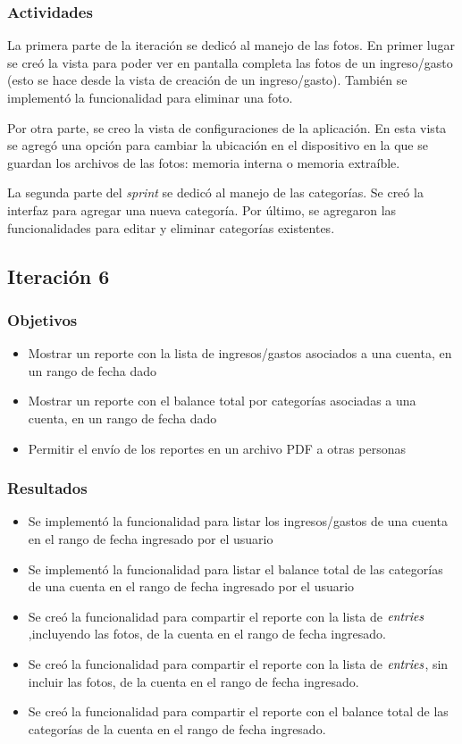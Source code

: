 \subsubsection{Actividades}
La primera parte de la iteración se dedicó al manejo de las fotos. En primer lugar se creó la vista para poder ver en pantalla completa las fotos de un ingreso/gasto (esto se hace desde la vista de creación de un ingreso/gasto). También se implementó la funcionalidad para eliminar una foto.

Por otra parte, se creo la vista de configuraciones de la aplicación. En esta vista se agregó una opción para cambiar la ubicación en el dispositivo en la que se guardan los archivos de las fotos: memoria interna o memoria extraíble.

La segunda parte del \textit{sprint} se dedicó al manejo de las categorías. Se creó la interfaz para agregar una nueva categoría. Por último, se agregaron las funcionalidades para editar y eliminar categorías existentes.


\subsection{Iteración 6}
\subsubsection{Objetivos}
\begin{itemize}
\item Mostrar un reporte con la lista de ingresos/gastos asociados a una cuenta, en un rango de fecha dado
\item Mostrar un reporte con el balance total por categorías asociadas a una cuenta, en un rango de fecha dado
\item Permitir el envío de los reportes en un archivo PDF a otras personas

\end{itemize}

\subsubsection{Resultados}
\begin{itemize}
\item Se implementó la funcionalidad para listar los ingresos/gastos de una cuenta en el rango de fecha ingresado por el usuario
\item Se implementó la funcionalidad para listar el balance total de las categorías de una cuenta en el rango de fecha ingresado por el usuario
\item Se creó la funcionalidad para compartir el reporte con la lista de $\textit{entries}$,incluyendo las fotos, de la cuenta en el rango de fecha ingresado.
\item Se creó la funcionalidad para compartir el reporte con la lista de $\textit{entries}$, sin incluir las fotos, de la cuenta en el rango de fecha ingresado.
\item Se creó la funcionalidad para compartir el reporte con el balance total de las categorías de la cuenta en el rango de fecha ingresado.
\end{itemize}

